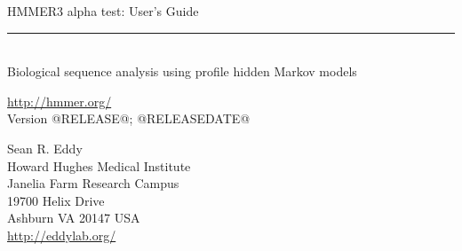 \begin{titlepage}
{\Large

\vspace*{\fill}

\noindent
{\Huge {HMMER3 alpha test: User's Guide}} \vspace{-8.0pt} \\ 
\rule[2pt]{\textwidth}{1pt} \\
\hspace*{\fill} {\large {Biological sequence analysis using
profile hidden Markov models} \\ }

\vspace*{\fill}

\begin{center}
\url{http://hmmer.org/}\\
Version @RELEASE@; @RELEASEDATE@ \\ 

\vspace*{\fill}

Sean R. Eddy\\
Howard Hughes Medical Institute\\
Janelia Farm Research Campus\\
19700 Helix Drive\\
Ashburn VA 20147 USA\\
\url{http://eddylab.org/} \\
\end{center}

\vspace*{\fill}

}
\end{titlepage}
